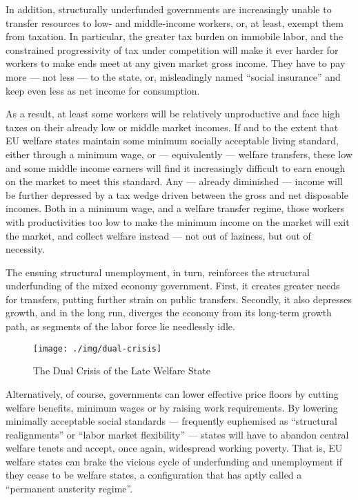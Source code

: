 \documentclass[11pt,a4paper,oneside]{article}
\begin{document}
In addition, structurally underfunded governments are increasingly unable to transfer resources to low- and middle-income workers, or, at least, exempt them from taxation. 
In particular, the greater tax burden on immobile labor, and the constrained progressivity of tax under competition will make it ever harder for workers to make ends meet at any given market gross income. 
They have to pay more --- not less --- to the state, or, misleadingly named ``social insurance'' and keep even less as net income for consumption.

As a result, at least some workers will be relatively unproductive and face high taxes on their already low or middle market incomes. 
If and to the extent that \gls{EU} welfare states maintain some minimum socially acceptable living standard, either through a minimum wage, or --- equivalently --- welfare transfers, these low and some middle income earners will find it increasingly difficult to earn enough on the market to meet this standard. 
Any --- already diminished --- income will be further depressed by a tax wedge driven between the gross and net disposable incomes. 
Both in a minimum wage, and a welfare transfer regime, those workers with productivities too low to make the minimum income on the market will exit the market, and collect welfare instead --- not out of laziness, but out of necessity. 

The ensuing structural unemployment, in turn, reinforces the structural underfunding of the mixed economy government. 
First, it creates greater needs for transfers, putting further strain on public transfers. 
Secondly, it also depresses growth, and in the long run, diverges the economy from its long-term growth path, as segments of the labor force lie needlessly idle.

\begin{figure}[htbp]
	\begin{center}
	\texttt{[image: ./img/dual-crisis]}  
	\caption{The Dual Crisis of the Late Welfare State}
	\label{fig:dual-crisis}
	\end{center}
\end{figure} %

Alternatively, of course, governments can lower effective price floors by cutting welfare benefits, minimum wages or by raising work requirements. 
By lowering minimally acceptable social standards --- frequently euphemised as ``structural realignments'' or ``labor market flexibility'' --- states will have to abandon central welfare tenets and accept, once again, widespread working poverty. 
That is, \gls{EU} welfare states can brake the vicious cycle of underfunding and unemployment if they cease to be welfare states, a configuration that \cite{Streeck2010b} has aptly called a ``permanent austerity regime''. 
\end{document}
